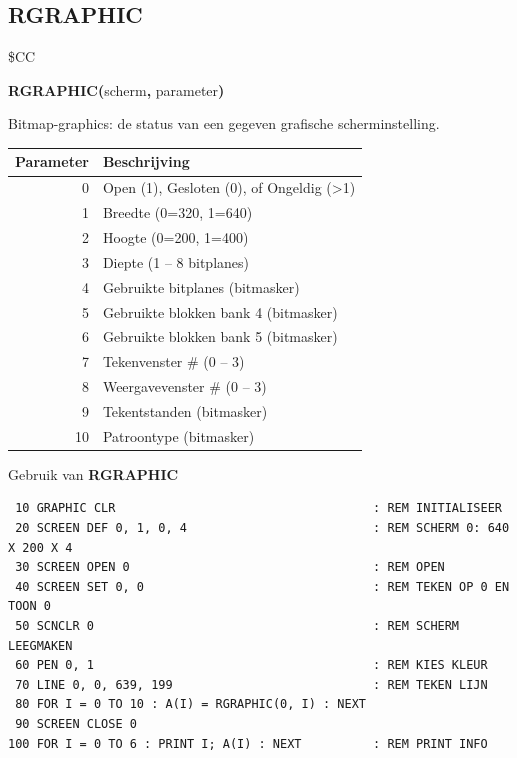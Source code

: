 \subsection{RGRAPHIC}
\begin{description}[leftmargin=2cm,style=nextline]
\item [Token:]    \$CC

\item [Formaat:]   {\bf RGRAPHIC(}scherm{\bf,} parameter{\bf)}

\item [Retourneert:]  Bitmap-graphics: de status van een gegeven grafische scherminstelling.

                  \begin{center}
                  {\setlength{\tabcolsep}{1mm}
                  \begin{tabular}{|r|l|}
                  \hline
                  {\bf Parameter} & {\bf Beschrijving} \\
                  \hline
                  0  & Open (1), Gesloten (0), of Ongeldig (>1) \\        1  & Breedte (0=320, 1=640) \\                  2  & Hoogte (0=200, 1=400) \\                  3  & Diepte (1 -- 8 bitplanes) \\                  4  & Gebruikte bitplanes (bitmasker) \\                  5  & Gebruikte blokken bank 4 (bitmasker) \\                  6  & Gebruikte blokken bank 5 (bitmasker) \\                  7  & Tekenvenster \# (0 -- 3) \\                  8  & Weergavevenster \# (0 -- 3) \\                  9  & Tekentstanden (bitmasker) \\                  10 & Patroontype (bitmasker) \\
                  \hline
                  \end{tabular}
                  }
                  \end{center}

\item [Voorbeeld:]  Gebruik van {\bf RGRAPHIC}

\begin{tcolorbox}[colback=black,coltext=white]
\verbatimfont{\codefont}
\begin{verbatim}
 10 GRAPHIC CLR                                    : REM INITIALISEER
 20 SCREEN DEF 0, 1, 0, 4                          : REM SCHERM 0: 640 X 200 X 4
 30 SCREEN OPEN 0                                  : REM OPEN
 40 SCREEN SET 0, 0                                : REM TEKEN OP 0 EN TOON 0
 50 SCNCLR 0                                       : REM SCHERM LEEGMAKEN
 60 PEN 0, 1                                       : REM KIES KLEUR
 70 LINE 0, 0, 639, 199                            : REM TEKEN LIJN
 80 FOR I = 0 TO 10 : A(I) = RGRAPHIC(0, I) : NEXT
 90 SCREEN CLOSE 0
100 FOR I = 0 TO 6 : PRINT I; A(I) : NEXT          : REM PRINT INFO


\end{verbatim}
\end{tcolorbox}
\end{description}
